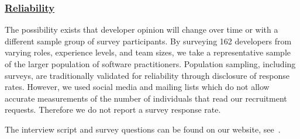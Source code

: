 \subsubsection{\underline{Reliability}}
The possibility exists that developer opinion will change over time or with a different sample group of survey participants.
By surveying 162 developers from varying roles, experience levels, and team sizes, we take a representative sample of the larger population of software practitioners.
Population sampling, including surveys, are traditionally validated for reliability through disclosure of response rates.
However, we used social media and mailing lists which do not allow accurate measurements of the number of individuals that read our recruitment requests.
Therefore we do not report a survey response rate.

The interview script and survey questions can be found on our website, see~\cite{companion_site}.

